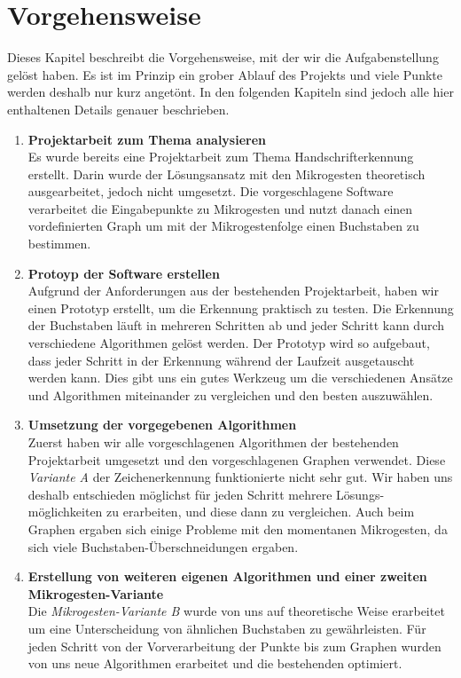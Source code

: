 \chapter{Vorgehensweise}
Dieses Kapitel beschreibt die Vorgehensweise, mit der wir die Aufgabenstellung gelöst haben. Es ist im Prinzip ein grober Ablauf des Projekts und viele Punkte werden deshalb nur kurz angetönt. In den folgenden Kapiteln sind jedoch alle hier enthaltenen Details genauer beschrieben.

\begin{enumerate}
\item \textbf{Projektarbeit zum Thema analysieren} \\ 
Es wurde bereits eine Projektarbeit \cite{zeichenerkennung_pa} zum Thema Handschrifterkennung erstellt. Darin wurde der Lösungsansatz mit den Mikrogesten theoretisch ausgearbeitet, jedoch nicht umgesetzt. Die vorgeschlagene Software verarbeitet die Eingabepunkte zu Mikrogesten und nutzt danach einen vordefinierten Graph um mit der Mikrogestenfolge einen Buchstaben zu bestimmen.

\item \textbf{Protoyp der Software erstellen} \\
Aufgrund der Anforderungen aus der bestehenden Projektarbeit, haben wir einen Prototyp erstellt, um die Erkennung praktisch zu testen. Die Erkennung der Buchstaben läuft in mehreren Schritten ab und jeder Schritt kann durch verschiedene Algorithmen gelöst werden. Der Prototyp wird so aufgebaut, dass jeder Schritt in der Erkennung während der Laufzeit ausgetauscht werden kann. Dies gibt uns ein gutes Werkzeug um die verschiedenen Ansätze und Algorithmen miteinander zu vergleichen und den besten auszuwählen.

\item \textbf{Umsetzung der vorgegebenen Algorithmen} \\
Zuerst haben wir alle vorgeschlagenen Algorithmen der bestehenden Projektarbeit umgesetzt und den vorgeschlagenen Graphen verwendet. Diese \emph{Variante A} der Zeichenerkennung funktionierte nicht sehr gut. Wir haben uns deshalb entschieden möglichst für jeden Schritt mehrere Lösungs-möglichkeiten zu erarbeiten, und diese dann zu vergleichen. Auch beim Graphen ergaben sich einige Probleme mit den momentanen Mikrogesten, da sich viele Buchstaben-Überschneidungen ergaben.

\item \textbf{Erstellung von weiteren eigenen Algorithmen und einer zweiten Mikrogesten-Variante} \\
Die \emph{Mikrogesten-Variante B} wurde von uns auf theoretische Weise erarbeitet um eine Unterscheidung von ähnlichen Buchstaben zu gewährleisten. Für jeden Schritt von der Vorverarbeitung der Punkte bis zum Graphen wurden von uns neue Algorithmen erarbeitet und die bestehenden optimiert. 


\end{enumerate}
